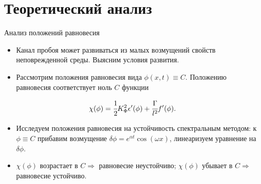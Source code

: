 \section{Теоретический анализ}

\begin{frame}{Анализ положений равновесия}
\begin{itemize}
	\item Канал пробоя может развиваться из малых возмущений свойств неповрежденной среды. Выясним условия развития.
	\item Рассмотрим положения равновесия вида $\phi(x, t) \equiv C$. Положению равновесия соответствует ноль $C$ функции
\end{itemize}
$$\chi(\phi) = \cfrac{1}{2} K_\Phi^2 \epsilon'(\phi) + \cfrac{\Gamma}{l^2} f'(\phi).$$
\vspace{-0.5cm}
\begin{itemize}
	\item Исследуем положения равновесия на устойчивость спектральным методом: к $\phi \equiv C$ прибавим возмущение $\delta \phi = e^{\alpha t} \cos(\omega x)$, линеаризуем уравнение на $\delta \phi$.
	\item $\chi(\phi)$ возрастает в $C \Longrightarrow$ равновесие неустойчиво; $\chi(\phi)$ убывает в $C \Longrightarrow$ равновесие устойчиво.
\end{itemize}
\end{frame}


